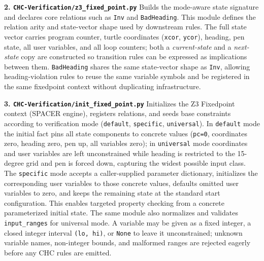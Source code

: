 \textbf{2. \texttt{CHC-Verification/z3\_fixed\_point.py}}
Builds the mode-aware state signature and declares core relations such as \texttt{Inv} and \texttt{BadHeading}. This module defines the relation arity and state-vector shape used by downstream rules.
The full state vector carries program counter, turtle coordinates (\texttt{xcor}, \texttt{ycor}), heading, pen state, all user variables, and all loop counters; both a \emph{current-state} and a \emph{next-state} copy are constructed so transition rules can be expressed as implications between them.
\texttt{BadHeading} shares the same state-vector shape as \texttt{Inv}, allowing heading-violation rules to reuse the same variable symbols and be registered in the same fixedpoint context without duplicating infrastructure.

\textbf{3. \texttt{CHC-Verification/init\_fixed\_point.py}}
Initializes the Z3 Fixedpoint context (SPACER engine), registers relations, and seeds base constraints according to verification mode (\texttt{default}, \texttt{specific}, \texttt{universal}).
In \texttt{default} mode the initial fact pins all state components to concrete values (\texttt{pc=0}, coordinates zero, heading zero, pen up, all variables zero); in \texttt{universal} mode coordinates and user variables are left unconstrained while heading is restricted to the 15-degree grid and pen is forced down, capturing the widest possible input class.
The \texttt{specific} mode accepts a caller-supplied parameter dictionary, initializes the corresponding user variables to those concrete values, defaults omitted user variables to zero, and keeps the remaining state at the standard start configuration. This enables targeted property checking from a concrete parameterized initial state.
The same module also normalizes and validates \texttt{input\_ranges} for universal mode. A variable may be given as a fixed integer, a closed integer interval \texttt{(lo, hi)}, or \texttt{None} to leave it unconstrained; unknown variable names, non-integer bounds, and malformed ranges are rejected eagerly before any CHC rules are emitted.

